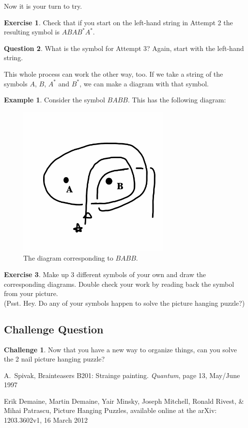 \documentclass[12pt,letterpaper]{article}
\theoremstyle{definition}
\newtheorem{question}{Question}
\newtheorem{example}{Example}
\newtheorem{exercise}[question]{Exercise}
\newtheorem*{challenge}{Challenge}
\begin{document}
Now it is your turn to try.
\begin{exercise}
Check that if you start on the left-hand string in Attempt 2 the resulting symbol is $ABAB^*A^*$.
\end{exercise}

\begin{question}
What is the symbol for Attempt 3? Again, start with the left-hand string.
\end{question}

This whole process can work the other way, too.
If we take a string of the symbols $A$, $B$, $A^*$ and $B^*$, we can make a diagram with that symbol.
\begin{example} 
Consider the symbol $BABB$.
This has the following diagram:
\begin{figure}[h]
    \centering
    \includegraphics[height=3in]{phppics/code2diagr.png}
    \caption{The diagram corresponding to $BABB$.}
\end{figure}
\end{example}

\begin{exercise} Make up 3 different symbols of your own and draw the corresponding diagrams.
Double check your work by reading back the symbol from your picture.\\
(Psst. Hey. Do any of your symbols happen to solve the picture hanging puzzle?)
\end{exercise}

\subsection*{Challenge Question}

\begin{challenge}
Now that you have a new way to organize things, can you solve the 2 nail picture hanging puzzle?
\end{challenge}

\begin{thebibliography}{9}

    A.~Spivak,
    Brainteasers B201: Strainge painting.
    \emph{Quantum}, page 13,
    May/June 1997

    Erik Demaine, Martin Demaine, Yair Minsky, Joseph Mitchell, Ronald Rivest, \& Mihai Patrascu,
    Picture Hanging Puzzles,
    available online at the arXiv: 1203.3602v1,
    16 March 2012
 
 \end{thebibliography}
\end{document}

